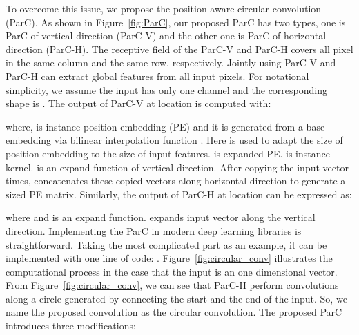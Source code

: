 \documentclass[10pt,twocolumn,letterpaper]{article}
\begin{document}
To overcome this issue, we propose the position aware circular convolution (ParC). As shown in Figure~\ref{fig:ParC}, our proposed ParC has two types, one is ParC of vertical direction (ParC-V) and the other one is ParC of horizontal direction (ParC-H). The receptive field of the ParC-V and ParC-H covers all pixel in the same column and the same row, respectively. Jointly using ParC-V and ParC-H can extract global features from all input pixels. For notational simplicity, we assume the input  has only one channel and the corresponding shape is . The output of ParC-V at location  is computed with:

where,  is instance position embedding (PE) and it is generated from a base embedding  via bilinear interpolation function . Here  is used to adapt the size of position embedding to the size of input features.  is expanded PE.  is instance kernel.  is an expand function of vertical direction. After copying the input vector  times,  concatenates these copied vectors along horizontal direction to generate a -sized PE matrix. Similarly, the output of ParC-H at location  can be expressed as:
 
where  and  is an expand function.  expands input vector along the vertical direction. Implementing the ParC in modern deep learning libraries is straightforward. Taking the most complicated part  as an example, it can be implemented with one line of code:
.  Figure~\ref{fig:circular_conv} illustrates the computational process in the case that the input is an one dimensional vector. From Figure~\ref{fig:circular_conv}, we can see that ParC-H perform convolutions along a circle generated by connecting the start and the end of the input. So, we name the proposed convolution as the circular convolution. The proposed ParC introduces three modifications:
\end{document}
